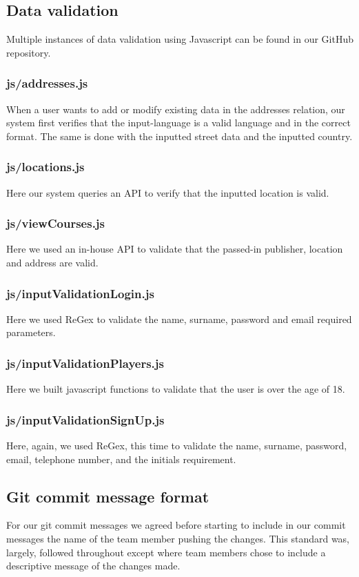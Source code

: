 \documentclass[titlepage]{article}
\begin{document}
\subsection{Data validation}
Multiple instances of data validation using Javascript can be found in our GitHub repository.

\subsubsection{js/addresses.js}
When a user wants to add or modify existing data in the addresses relation, our system first verifies that the
input-language is a valid language and in the correct format. The same is done with the inputted street data
and the inputted country.

\subsubsection{js/locations.js}
Here our system queries an API to verify that the inputted location is valid.

\subsubsection{js/viewCourses.js}
Here we used an in-house API to validate that the passed-in publisher, location and address are valid.

\subsubsection{js/inputValidationLogin.js}
Here we used ReGex to validate the name, surname, password and email required parameters.

\subsubsection{js/inputValidationPlayers.js}
Here we built javascript functions to validate that the user is over the age of 18. 

\subsubsection{js/inputValidationSignUp.js}
Here, again, we used ReGex, this time to validate the name, surname, password, email, telephone number,
and the initials requirement.

\subsection{Git commit message format}
For our git commit messages we agreed before starting to include in our commit messages the name of the team member
pushing the changes. This standard was, largely, followed throughout except where team members chose to include
a descriptive message of the changes made.
\end{document}
